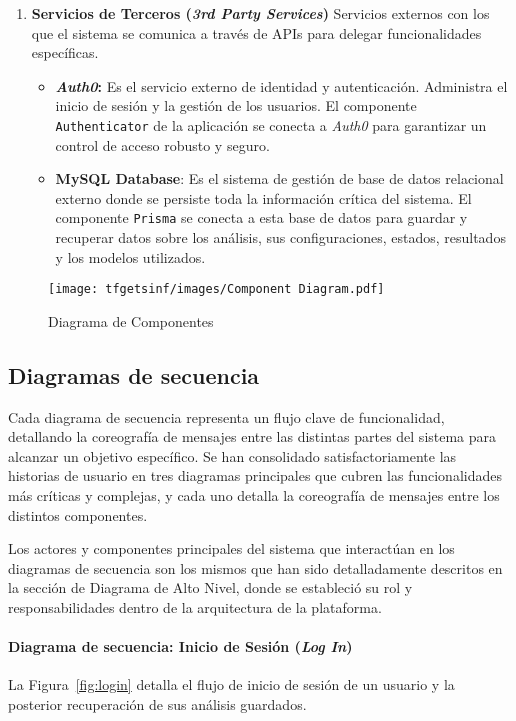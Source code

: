 \begin{enumerate}
    \item \textbf{Servicios de Terceros (\textit{3rd Party Services})}
    Servicios externos con los que el sistema se comunica a través de APIs para delegar funcionalidades específicas.
    \begin{itemize}
        \item \textbf{\textit{Auth0}:} Es el servicio externo de identidad y autenticación. Administra el inicio de sesión y la gestión de los usuarios. El componente \texttt{Authenticator} de la aplicación se conecta a \textit{Auth0} para garantizar un control de acceso robusto y seguro.
        \item \textbf{MySQL Database}: Es el sistema de gestión de base de datos relacional externo donde se persiste toda la información crítica del sistema. El componente \texttt{Prisma} se conecta a esta base de datos para guardar y recuperar datos sobre los análisis, sus configuraciones, estados, resultados y los modelos utilizados.
    \end{itemize}

\end{enumerate}

\begin{figure}[H]
    \centering
    \texttt{[image: tfgetsinf/images/Component Diagram.pdf]}
    \caption{Diagrama de Componentes}
    \label{fig:componentes}
\end{figure}


\subsection{Diagramas de secuencia}
Cada diagrama de secuencia representa un flujo clave de funcionalidad, detallando la coreografía de mensajes entre las distintas partes del sistema para alcanzar un objetivo específico. 
Se han consolidado satisfactoriamente las historias de usuario en tres diagramas principales que cubren las funcionalidades más críticas y complejas, y cada uno detalla la coreografía de mensajes entre los distintos componentes.

Los actores y componentes principales del sistema que interactúan en los diagramas de secuencia son los mismos que han sido detalladamente descritos en la sección de Diagrama de Alto Nivel, donde se estableció su rol y responsabilidades dentro de la arquitectura de la plataforma.

\paragraph{Diagrama de secuencia: Inicio de Sesión (\textit{Log In})}
La Figura~\ref{fig:login} detalla el flujo de inicio de sesión de un usuario y la posterior recuperación de sus análisis guardados.

